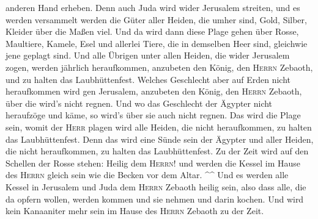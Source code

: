 anderen Hand erheben.  Denn auch Juda wird wider
Jerusalem streiten, und es werden versammelt werden die Güter aller
Heiden, die umher sind, Gold, Silber, Kleider über die Maßen viel.
 Und da wird dann diese Plage gehen über Rosse,
Maultiere, Kamele, Esel und allerlei Tiere, die in demselben Heer sind,
gleichwie jene geplagt sind.  Und alle Übrigen unter
allen Heiden, die wider Jerusalem zogen, werden jährlich heraufkommen,
anzubeten den König, den \textsc{Herrn} Zebaoth, und zu halten das
Laubhüttenfest.  Welches Geschlecht aber auf Erden nicht
heraufkommen wird gen Jerusalem, anzubeten den König, den \textsc{Herrn}
Zebaoth, über die wird's nicht regnen.  Und wo das
Geschlecht der Ägypter nicht heraufzöge und käme, so wird's über sie
auch nicht regnen. Das wird die Plage sein, womit der \textsc{Herr}
plagen wird alle Heiden, die nicht heraufkommen, zu halten das
Laubhüttenfest.  Denn das wird eine Sünde sein der
Ägypter und aller Heiden, die nicht heraufkommen, zu halten das
Laubhüttenfest.  Zu der Zeit wird auf den Schellen der
Rosse stehen: Heilig dem \textsc{Herrn}! und werden die Kessel im Hause
des \textsc{Herrn} gleich sein wie die Becken vor dem Altar. \^{}\^{}
 Und es werden alle Kessel in Jerusalem und Juda dem
\textsc{Herrn} Zebaoth heilig sein, also dass alle, die da opfern
wollen, werden kommen und sie nehmen und darin kochen. Und wird kein
Kanaaniter mehr sein im Hause des \textsc{Herrn} Zebaoth zu der Zeit.
